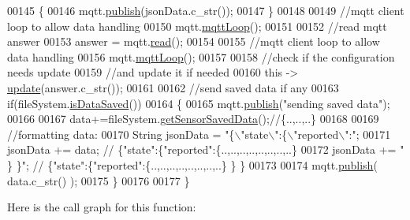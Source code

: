 \begin{DoxyCode}
00145     \{
00146         mqtt.\hyperlink{class_cool_m_q_t_t_ace977b3e90ab14b1199fe5c4fb0a13ec}{publish}(jsonData.c\_str());
00147     \}
00148 
00149     \textcolor{comment}{//mqtt client loop to allow data handling}
00150     mqtt.\hyperlink{class_cool_m_q_t_t_aa5eaae967b562b62cbcf2b8d81f6e5d5}{mqttLoop}();
00151 
00152     \textcolor{comment}{//read mqtt answer}
00153     answer = mqtt.\hyperlink{class_cool_m_q_t_t_ae3c18f6ae9723746d32765f1c8f176ca}{read}();
00154     
00155     \textcolor{comment}{//mqtt client loop to allow data handling}
00156     mqtt.\hyperlink{class_cool_m_q_t_t_aa5eaae967b562b62cbcf2b8d81f6e5d5}{mqttLoop}();
00157 
00158     \textcolor{comment}{//check if the configuration needs update }
00159     \textcolor{comment}{//and update it if needed }
00160     \textcolor{keyword}{this} -> \hyperlink{class_cool_board_a8612756d3f73198cdde857a66f0fe690}{update}(answer.c\_str());
00161     
00162     \textcolor{comment}{//send saved data if any}
00163     \textcolor{keywordflow}{if}(fileSystem.\hyperlink{class_cool_file_system_a5a7eaeea7a9fbf8aaef651d862fa3b5b}{isDataSaved}())
00164     \{
00165         mqtt.\hyperlink{class_cool_m_q_t_t_ace977b3e90ab14b1199fe5c4fb0a13ec}{publish}(\textcolor{stringliteral}{"sending saved data"});
00166         
00167         data+=fileSystem.\hyperlink{class_cool_file_system_a5c58bca3735c0ed3efb268d70ef998ef}{getSensorSavedData}();\textcolor{comment}{//\{..,..,..\}}
00168 
00169         \textcolor{comment}{//formatting data:}
00170         String jsonData = \textcolor{stringliteral}{"\{\(\backslash\)"state\(\backslash\)":\{\(\backslash\)"reported\(\backslash\)":"};
00171         jsonData += data; \textcolor{comment}{// \{"state":\{"reported":\{..,..,..,..,..,..,..,..\}}
00172         jsonData += \textcolor{stringliteral}{" \} \}"}; \textcolor{comment}{// \{"state":\{"reported":\{..,..,..,..,..,..,..,..\}  \} \}}
00173 
00174         mqtt.\hyperlink{class_cool_m_q_t_t_ace977b3e90ab14b1199fe5c4fb0a13ec}{publish}( data.c\_str() );
00175     \}
00176         
00177 \}
\end{DoxyCode}
Here is the call graph for this function\+:
\nopagebreak
